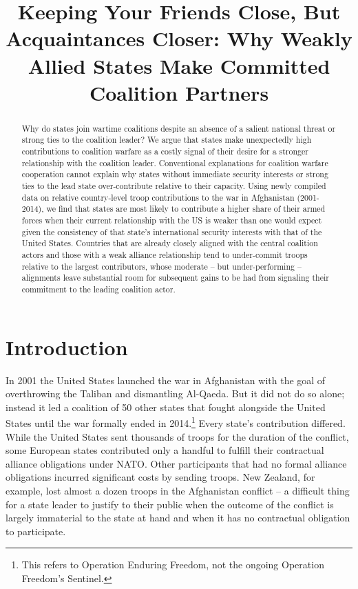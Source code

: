 \documentclass[12pt,letterpaper]{article}
\title{Keeping Your Friends Close, But Acquaintances Closer: Why Weakly Allied States Make Committed Coalition Partners}
\begin{document}
	
\begin{singlespace}
\maketitle

\begin{abstract}
Why do states join wartime coalitions despite an absence of a salient national threat or strong ties to the coalition leader? We argue that states make unexpectedly high contributions to coalition warfare as a costly signal of their desire for a stronger relationship with the coalition leader. Conventional explanations for coalition warfare cooperation cannot explain why states without immediate security interests or strong ties to the lead state over-contribute relative to their capacity. Using newly compiled data on relative country-level troop contributions to the war in Afghanistan (2001-2014), we find that states are most likely to contribute a higher share of their armed forces when their current relationship with the US is weaker than one would expect given the consistency of that state's international security interests with that of the United States. Countries that are already closely aligned with the central coalition actors and those with a weak alliance relationship tend to under-commit troops relative to the largest contributors, whose moderate -- but under-performing -- alignments leave substantial room for subsequent gains to be had from signaling their commitment to the leading coalition actor.
\end{abstract}
\end{singlespace}

\section{Introduction}
	In 2001 the United States launched the war in Afghanistan with the goal of overthrowing the Taliban and dismantling Al-Qaeda. But it did not do so alone; instead it led a coalition of 50 other states that fought alongside the United States until the war formally ended in 2014.\footnote{This refers to Operation Enduring Freedom, not the ongoing Operation Freedom's Sentinel.} Every state's contribution differed. While the United States sent thousands of troops for the duration of the conflict, some European states contributed only a handful to fulfill their contractual alliance obligations under NATO. Other participants that had no formal alliance obligations incurred significant costs by sending troops. New Zealand, for example, lost almost a dozen troops in the Afghanistan conflict -- a difficult thing for a state leader to justify to their public when the outcome of the conflict is largely immaterial to the state at hand and when it has no contractual obligation to participate.
\end{document}
